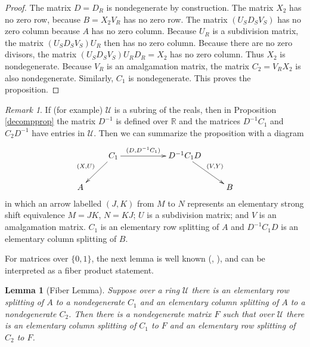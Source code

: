 \documentclass{amsart}
\newtheorem{lemma}[theorem]{Lemma}
\theoremstyle{definition}
\theoremstyle{remark}
\newtheorem{remark}[theorem]{Remark}
\numberwithin{equation}{section}
\begin{document}
{\begin{proof}
The matrix $D=D_R$ is nondegenerate by construction.  
The matrix $X_2$ has no zero row, because $B=X_2V_R$ has 
no zero row. The matrix $(U_SD_SV_S)$ has no zero column because 
$A$ has no zero column. Because $U_R$ is a subdivision matrix, 
the matrix $(U_SD_SV_S)U_R$ then has no zero column. Because 
there are no zero divisors, the matrix 
$(U_SD_SV_S)U_RD_R=X_2$ has no zero column. Thus $X_2$ is nondegenerate. 
Because $V_R$ is an amalgamation matrix, the matrix 
$C_2=V_RX_2$ is also nondegenerate. Similarly, $C_1$ is nondegenerate. 
This proves the proposition. 
\end{proof} 


\begin{remark} \label{diagramremark} 
If (for example) $\mathcal U$ is a subring of the reals, 
then in Proposition \ref{decompprop} 
the matrix $D^{-1}$ is defined 
over $\mathbb R$ and 
the matrices $D^{-1}C_1$ and $C_2D^{-1}$ have entries in $\mathcal U$. 
Then we can summarize the proposition with a diagram 
\begin{equation} \label{elsplitdiagram} 
\xymatrix{ 
       & C_1 \ar[rr]^-{(D, D^{-1}C_1)} \ar[dl]_{(X,U)}   &  & D^{-1}C_1D \ar[dr]^{(V,Y)}  &     \\ 
A      &                                          &  &                   &  B 
}
\end{equation}
in which an arrow labelled $(J,K)$ from $M$ to $N$ represents an elementary 
strong shift equivalence $M=JK$,  $N=KJ$; $U$ is a subdivision matrix; and 
$V$  is an amalgamation matrix. $C_1$ is an elementary row splitting of 
$A$ and $D^{-1}C_1D$ is an elementary column splitting of $B$. 
\end{remark} 

For matrices over $\{0,1\}$, the next lemma is well known 
(\cite{Pa}, 
\cite[Theorem 2.1.14]{Ki}),  and can be interpreted 
as a fiber product statement.

\begin{lemma}[Fiber Lemma]  \label{fiberlemma}
Suppose over 
a ring $\mathcal U$ there is an elementary row splitting of 
$A$ to a nondegenerate $C_1$ and an elementary column splitting of $A$ to 
a nondegenerate $C_2$. Then there is a 
nondegenerate matrix $F$ such that 
over $\mathcal U$ there is an elementary  
column splitting of $C_1$ to
$F$ and an elementary  row 
splitting of $C_2$ to $F$. 


\end{lemma}}
\end{document}
